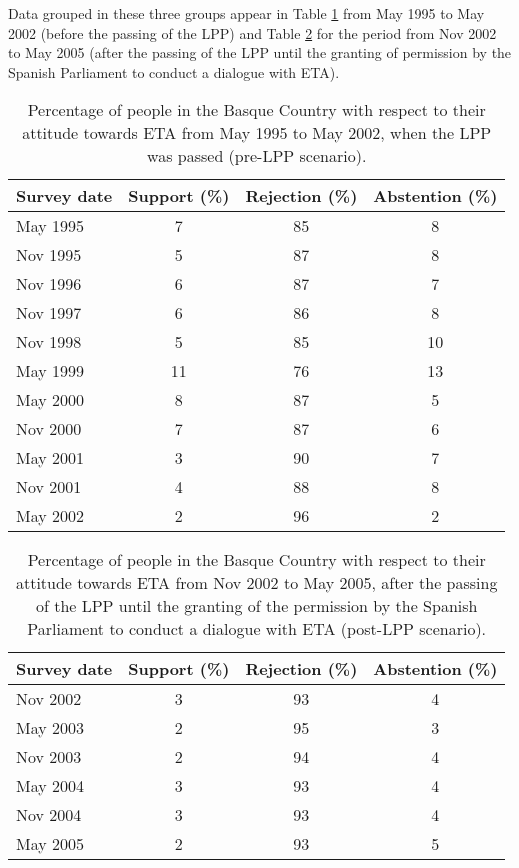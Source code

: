 Data grouped in these three groups appear in Table \ref{2TABLA2} from May 1995 to May 2002 (before the passing of the LPP) and Table \ref{2TABLA3} for the period from Nov 2002 to May 2005 (after the passing of the LPP until the granting of permission by the Spanish Parliament to conduct a dialogue with ETA).

\begin{table}[ht]
\centering
\begin{tabular}{|l|c|c|c|}
\hline
  Survey date  & Support (\%) & Rejection (\%) & Abstention (\%) \\ 
\hline
 May 1995 & 7	&85	&8 \\
 Nov 1995 & 5	&87	&8 \\
 Nov 1996 & 6	&87	&7 \\
 Nov 1997 & 6	&86	&8 \\
 Nov 1998 & 5	&85	&10 \\
 May 1999 & 11	&76	&13 \\
 May 2000 & 8	&87	&5 \\
 Nov 2000 & 7	&87	&6 \\
 May 2001 & 3	&90	&7 \\
 Nov 2001 & 4	&88	&8 \\
 May 2002 & 2	&96	&2 \\
 \hline 
\end{tabular} 
\caption{Percentage of people in the Basque Country with respect to their attitude towards ETA from May 1995 to May 2002, when  the LPP was passed (pre-LPP scenario).}
\label{2TABLA2} 
\end{table}

\begin{table}[ht]
\centering
\begin{tabular}{|l|c|c|c|}
\hline
     Survey date  & Support (\%) & Rejection (\%) & Abstention (\%) \\ 
\hline
 Nov 2002 & 3	&	93	&	4 \\
 May 2003 & 2 &	95	&	3 \\
 Nov 2003 & 2	&	94	&	4 \\
 May 2004 & 3	&	93	&	4 \\
 Nov 2004 & 3	&	93	&	4 \\
 May 2005 & 2 &	93	&	5 \\
 \hline 
\end{tabular} 
\caption{Percentage of people in the Basque Country with respect to their attitude towards ETA from Nov 2002 to May 2005, after the passing of the LPP until the granting of the permission by the Spanish Parliament to conduct a dialogue with ETA (post-LPP scenario).}
\label{2TABLA3} 
\end{table}

